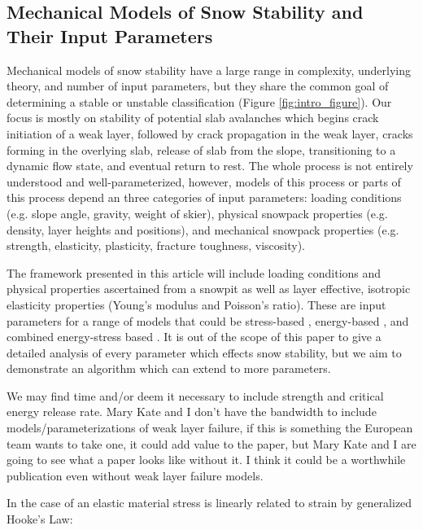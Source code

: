 \documentclass[journal abbreviation, manuscript]{copernicus}
\begin{document}
\FloatBarrier

\subsection{Mechanical Models of Snow Stability and Their Input Parameters}
Mechanical models of snow stability have a large range in complexity, underlying theory, and number of input parameters, but they share the common goal of determining a stable or unstable classification (Figure \ref{fig:intro_figure}). Our focus is mostly on stability of potential slab avalanches which begins crack initiation of a weak layer, followed by crack propagation in the weak layer, cracks forming in the overlying slab, release of slab from the slope, transitioning to a dynamic flow state, and eventual return to rest. The whole process is not entirely understood and well-parameterized, however, models of this process or parts of this process depend an three categories of input parameters: loading conditions (e.g. slope angle, gravity, weight of skier), physical snowpack properties (e.g. density, layer heights and positions), and mechanical snowpack properties (e.g. strength, elasticity, plasticity, fracture toughness, viscosity). 

The framework presented in this article will include loading conditions and physical properties ascertained from a snowpit as well as layer effective, isotropic elasticity properties (Young's modulus and Poisson's ratio). These are input parameters for a range of models that could be stress-based \citep{roch1965, reiweger2015}, energy-based \citep{heierli2008}, and combined energy-stress based \citep{rosendahlModelingSnowSlab2020a, weissgraeber2023, siron2023}.  It is out of the scope of this paper to give a detailed analysis of every parameter which effects snow stability, but we aim to demonstrate an algorithm which can extend to more parameters.


\textcolor{RubineRed}{We may find time and/or deem it necessary to include strength and critical energy release rate. Mary Kate and I don't have the bandwidth to include models/parameterizations of weak layer failure, if this is something the European team wants to take one, it could add value to the paper, but Mary Kate and I are going to see what a paper looks like without it. I think it could be a worthwhile publication even without weak layer failure models.}


In the case of an elastic material stress is linearly related to strain by generalized Hooke's Law:
\end{document}
